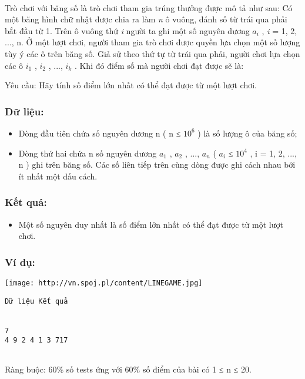 

 

Trò chơi với băng số là trò chơi tham gia trúng thưởng được mô tả như sau: Có một băng hình chữ nhật được chia ra làm \emph{ n } ô vuông, đánh số từ trái qua phải bắt đầu từ 1. Trên ô vuông thứ \emph{ i } người ta ghi một số nguyên dương \emph{ $a_{i}$} , \emph{ i } = 1, 2, ..., n. Ở một lượt chơi, người tham gia trò chơi được quyền lựa chọn một số lượng tùy ý các ô trên băng số. Giả sử theo thứ tự từ trái qua phải, người chơi lựa chọn các ô \emph{ $i_{1}$} , \emph{ $i_{2}$} , ..., \emph{ $i_{k}$} . Khi đó điểm số mà người chơi đạt được sẽ là:

Yêu cầu: Hãy tính số điểm lớn nhất có thể đạt được từ một lượt chơi.

\subsubsection{Dữ liệu:}
\begin{itemize}
	\item Dòng đầu tiên chứa số nguyên dương n ( n ≤ $10^{6}$ ) là số lượng ô của băng số;
	\item Dòng thứ hai chứa n số nguyên dương $a_{1}$ , $a_{2}$ , ..., $a_{n}$ ( $a_{i}$ ≤ $10^{4}$ , i = 1, 2, ..., n ) ghi trên băng số. Các số liên tiếp trên cùng dòng được ghi cách nhau bởi ít nhất một dấu cách.
\end{itemize}

\subsubsection{Kết quả:}
\begin{itemize}
	\item Một số nguyên duy nhất là số điểm lớn nhất có thể đạt được từ một lượt chơi.
\end{itemize}

\subsubsection{Ví dụ:}


\texttt{[image: http://vn.spoj.pl/content/LINEGAME.jpg]}
\begin{verbatim}
Dữ liệu Kết quả


7
4 9 2 4 1 3 717


\end{verbatim}

Ràng buộc: 60\% số tests ứng với 60\% số điểm của bài có 1 ≤ n ≤ 20.
